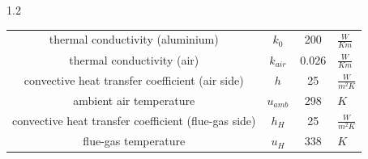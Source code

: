 \documentclass[preview]{standalone}
\begin{document}
\begin{spacing}{1.2}
\begin{tabular}{cccl}
\toprule
thermal conductivity (aluminium) & $k_0$ & 200 & $\frac{W}{K m}$ \\
thermal conductivity (air) & $k_{air}$ & 0.026 & $\frac{W}{K m}$ \\
convective heat transfer coefficient (air side) & $h$ & 25 & $\frac{W}{m^2 K}$ \\
ambient air temperature & $u_{amb}$ & 298 & $K$ \\
convective heat transfer coefficient (flue-gas side) & $h_H$ & 25 & $\frac{W}{m^2 K}$ \\
flue-gas temperature & $u_H$ & 338 & $K$ \\
\bottomrule
\end{tabular}
\end{spacing}
\end{document}
